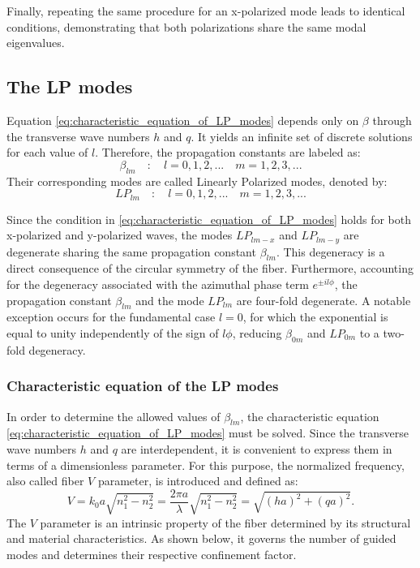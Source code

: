 Finally, repeating the same procedure for an x-polarized mode leads to identical conditions, demonstrating that both polarizations share the same modal eigenvalues.



\subsection{The LP modes}
Equation \eqref{eq:characteristic_equation_of_LP_modes} depends only on $\beta$ through the transverse wave numbers $h$ and $q$. It yields an infinite set of discrete solutions for each value of $l$. Therefore, the propagation constants are labeled as:
\begin{equation}
    \beta_{lm}\quad:\quad l=0,1,2,... \quad m=1,2,3,...
\end{equation}
Their corresponding modes are called Linearly Polarized modes, denoted by:
\begin{equation}
    LP_{lm}\quad:\quad l=0,1,2,... \quad m=1,2,3,...
\end{equation}

Since the condition in \eqref{eq:characteristic_equation_of_LP_modes} holds for both x-polarized and y-polarized waves, the modes $LP_{lm-x}$ and $LP_{lm-y}$ are degenerate sharing the same propagation constant $\beta_{lm}$. This degeneracy is a direct consequence of the circular symmetry of the fiber. Furthermore, accounting for the degeneracy associated with the azimuthal phase term $e^{\pm il\phi}$, the propagation constant $\beta_{lm}$ and the mode $LP_{lm}$ are four-fold degenerate. A notable exception occurs for the fundamental case $l=0$, for which the exponential is equal to unity independently of the sign of $l\phi$, reducing $\beta_{0m}$ and $LP_{0m}$ to a two-fold degeneracy.

\subsubsection{Characteristic equation of the LP modes}
In order to determine the allowed values of $\beta_{lm}$, the characteristic equation \eqref{eq:characteristic_equation_of_LP_modes} must be solved. Since the transverse wave numbers $h$ and $q$ are interdependent, it is convenient to express them in terms of a dimensionless parameter. For this purpose, the normalized frequency, also called fiber $V$ parameter, is introduced and defined as:
\begin{equation}
    V=k_0a\sqrt{n_1^2-n_2^2}=\frac{2\pi a}{\lambda}\sqrt{n_1^2-n_2^2}=\sqrt{(ha)^2+(qa)^2}.
\end{equation}
The $V$ parameter is an intrinsic property of the fiber determined by its structural and material characteristics. As shown below, it governs the number of guided modes and determines their respective confinement factor.

